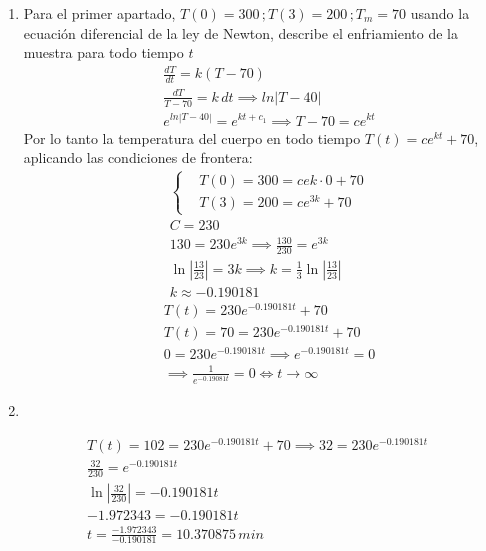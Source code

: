 \begin{enumerate}
    \item Para el primer apartado, $T(0)=300\, ;T(3)=200\, ; T_m=70$ usando la ecuación diferencial de la ley de Newton, describe el enfriamiento de la muestra para todo tiempo $t$
    \begin{align*}
        &\frac{d T}{d t}=k \left( T-70 \right)\\
        &\frac{d T}{T-70}=k \, dt\implies ln{\left\lvert T-40\right\rvert}\\
        &e^{ln{\left\lvert T-40\right\rvert}}=e^{kt+c_1}\implies T-70=ce^{kt}
    \end{align*}
    Por lo tanto la temperatura del cuerpo en todo tiempo $T(t)=ce^{kt}+70$, aplicando las condiciones de frontera:
    \begin{align*}
        &\begin{cases}
            &T(0)=300=ce{k\cdot 0}+70\\
            &T(3)=200=ce^{3k}+70
        \end{cases}\\
        &C=230\\
        &130=230e^{3k}\implies \frac{130}{230}=e^{3k}\\
        &\ln{\left\lvert \frac{13}{23}\right\rvert}=3k\implies k=\frac{1}{3}\ln{\left\lvert \frac{13}{23}\right\rvert}\\
        &k\approx -0.190181
    \end{align*}
    \begin{align*}
        &T(t)=230e^{-0.190181t}+70\\
        &T(t)=70=230e^{-0.190181t}+70\\
        &0=230e^{-0.190181t}\implies e^{-0.190181t}=0\\
        &\implies \frac{1}{e^{-0.19081t}}=0\Longleftrightarrow t\to \infty
    \end{align*}
    \item 
\end{enumerate}
\begin{align*}
    &T(t)=102=230e^{-0.190181t}+70\implies 32=230e^{-0.190181t}\\
    &\frac{32}{230}=e^{-0.190181t}\\
    &\ln{\left\lvert \frac{32}{230} \right\rvert }=-0.190181t\\
    &-1.972343=-0.190181t\\
    &t=\frac{-1.972343}{-0.190181}=10.370875\, min
\end{align*}

